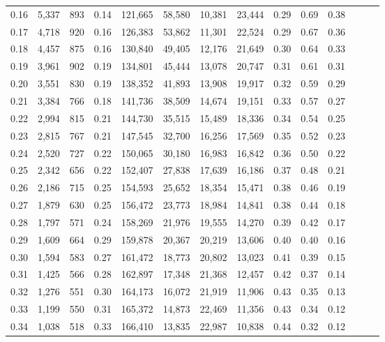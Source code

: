 \begin{tabular}{rrrrrrrrrrrrrr}
0.16 &   5,337 &  893 &  0.14 &  121,665 &   58,580 &  10,381 &  23,444 &  0.29 &  0.69 &      0.38 \\
0.17 &   4,718 &  920 &  0.16 &  126,383 &   53,862 &  11,301 &  22,524 &  0.29 &  0.67 &      0.36 \\
0.18 &   4,457 &  875 &  0.16 &  130,840 &   49,405 &  12,176 &  21,649 &  0.30 &  0.64 &      0.33 \\
0.19 &   3,961 &  902 &  0.19 &  134,801 &   45,444 &  13,078 &  20,747 &  0.31 &  0.61 &      0.31 \\
0.20 &   3,551 &  830 &  0.19 &  138,352 &   41,893 &  13,908 &  19,917 &  0.32 &  0.59 &      0.29 \\
0.21 &   3,384 &  766 &  0.18 &  141,736 &   38,509 &  14,674 &  19,151 &  0.33 &  0.57 &      0.27 \\
0.22 &   2,994 &  815 &  0.21 &  144,730 &   35,515 &  15,489 &  18,336 &  0.34 &  0.54 &      0.25 \\
0.23 &   2,815 &  767 &  0.21 &  147,545 &   32,700 &  16,256 &  17,569 &  0.35 &  0.52 &      0.23 \\
0.24 &   2,520 &  727 &  0.22 &  150,065 &   30,180 &  16,983 &  16,842 &  0.36 &  0.50 &      0.22 \\
0.25 &   2,342 &  656 &  0.22 &  152,407 &   27,838 &  17,639 &  16,186 &  0.37 &  0.48 &      0.21 \\
0.26 &   2,186 &  715 &  0.25 &  154,593 &   25,652 &  18,354 &  15,471 &  0.38 &  0.46 &      0.19 \\
0.27 &   1,879 &  630 &  0.25 &  156,472 &   23,773 &  18,984 &  14,841 &  0.38 &  0.44 &      0.18 \\
0.28 &   1,797 &  571 &  0.24 &  158,269 &   21,976 &  19,555 &  14,270 &  0.39 &  0.42 &      0.17 \\
0.29 &   1,609 &  664 &  0.29 &  159,878 &   20,367 &  20,219 &  13,606 &  0.40 &  0.40 &      0.16 \\
0.30 &   1,594 &  583 &  0.27 &  161,472 &   18,773 &  20,802 &  13,023 &  0.41 &  0.39 &      0.15 \\
0.31 &   1,425 &  566 &  0.28 &  162,897 &   17,348 &  21,368 &  12,457 &  0.42 &  0.37 &      0.14 \\
0.32 &   1,276 &  551 &  0.30 &  164,173 &   16,072 &  21,919 &  11,906 &  0.43 &  0.35 &      0.13 \\
0.33 &   1,199 &  550 &  0.31 &  165,372 &   14,873 &  22,469 &  11,356 &  0.43 &  0.34 &      0.12 \\
0.34 &   1,038 &  518 &  0.33 &  166,410 &   13,835 &  22,987 &  10,838 &  0.44 &  0.32 &      0.12 \\

\end{tabular}

